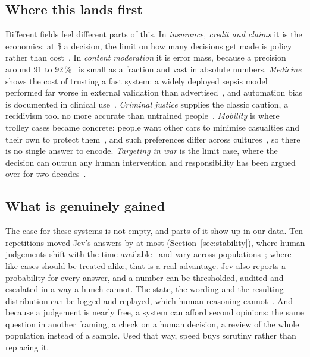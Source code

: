\documentclass[journal]{IEEEtran}
\begin{document}
\subsection{Where this lands first}

Different fields feel different parts of this. In \emph{insurance, credit and claims} it is the
economics: at \$\CostPerDecision{} a decision, the limit on how many decisions get made is policy
rather than cost~\cite{lemonade2017}. In \emph{content moderation} it is error mass, because a
precision around 91 to 92\,\%~\cite{meta2026} is small as a fraction and vast in absolute numbers.
\emph{Medicine} shows the cost of trusting a fast system: a widely deployed sepsis model performed
far worse in external validation than advertised~\cite{wong2021}, and automation bias is
documented in clinical use~\cite{goddard2012}. \emph{Criminal justice} supplies the classic
caution, a recidivism tool no more accurate than untrained people~\cite{dressel2018}.
\emph{Mobility} is where trolley cases became concrete: people want other cars to minimise
casualties and their own to protect them~\cite{bonnefon2016}, and such preferences differ across
cultures~\cite{awad2018}, so there is no single answer to encode. \emph{Targeting in war} is the
limit case, where the decision can outrun any human intervention and responsibility has been
argued over for two decades~\cite{sparrow2007,matthias2004}.


\subsection{What is genuinely gained}

The case for these systems is not empty, and parts of it show up in our data. Ten repetitions
moved Jev's answers by at most \MaxSpread{} (Section~\ref{sec:stability}), where human judgements
shift with the time available~\cite{suter2011} and vary across populations~\cite{awad2018}; where
like cases should be treated alike, that is a real advantage. Jev also reports a probability for
every answer, and a number can be thresholded, audited and escalated in a way a hunch cannot. The
state, the wording and the resulting distribution can be logged and replayed, which human
reasoning cannot~\cite{mittelstadt2016}. And because a judgement is nearly free, a system can
afford second opinions: the same question in another framing, a check on a human decision, a
review of the whole population instead of a sample. Used that way, speed buys scrutiny rather
than replacing it.
\end{document}
